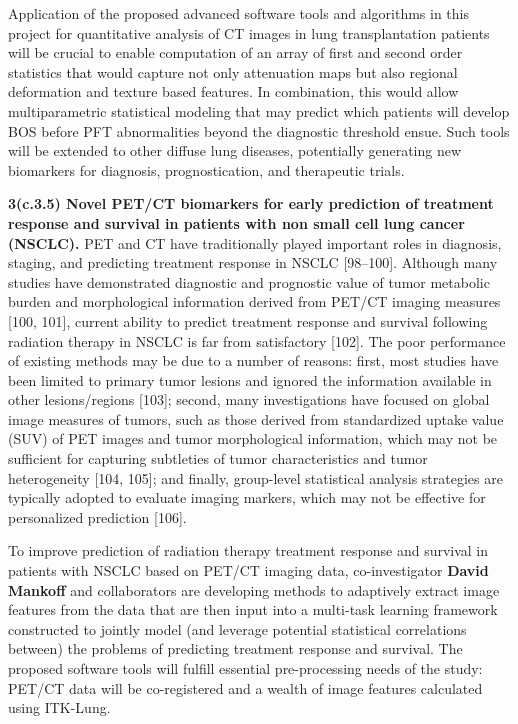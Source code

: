 \documentclass[11pt,]{article}
\begin{document}
Application of the proposed advanced software tools and algorithms in
this project for quantitative analysis of CT images in lung
transplantation patients will be crucial to enable computation of an
array of first and second order statistics \textcolor{black}{that} would
capture not only attenuation maps but also regional deformation and
texture based features. In combination, this would allow multiparametric
statistical modeling that may predict which patients will develop BOS
before PFT abnormalities beyond the diagnostic threshold ensue. Such
tools will be extended to other diffuse lung diseases, potentially
generating new biomarkers for diagnosis, prognostication, and
therapeutic trials.

\textbf{3(c.3.5) Novel PET/CT biomarkers for early prediction of
treatment response and survival in patients with non small cell lung
cancer (NSCLC).} PET and CT have traditionally played important roles in
diagnosis, staging, and predicting treatment response in NSCLC
{[}98--100{]}. Although many studies have demonstrated diagnostic and
prognostic value of tumor metabolic burden and morphological information
derived from PET/CT imaging measures {[}100, 101{]}, current ability to
predict treatment response and survival following radiation therapy in
NSCLC is far from satisfactory {[}102{]}. The poor performance of
existing methods may be due to a number of reasons: first, most studies
have been limited to primary tumor lesions and ignored the information
available in other lesions/regions {[}103{]}; second, many
investigations have focused on global image measures of tumors, such as
those derived from standardized uptake value (SUV) of PET images and
tumor morphological information, which may not be sufficient for
capturing subtleties of tumor characteristics and tumor heterogeneity
{[}104, 105{]}; and finally, group-level statistical analysis strategies
are typically adopted to evaluate imaging markers, which may not be
effective for personalized prediction {[}106{]}.

To improve prediction of radiation therapy treatment response and
survival in patients with NSCLC based on PET/CT imaging data,
co-investigator \textbf{David Mankoff} and collaborators are developing
methods to adaptively extract image features from the data that are then
input into a multi-task learning framework constructed to jointly model
(and leverage potential statistical correlations between) the problems
of predicting treatment response and survival. The proposed software
tools will fulfill essential pre-processing needs of the study: PET/CT
data will be co-registered and a wealth of image features calculated
using ITK-Lung.
\end{document}
